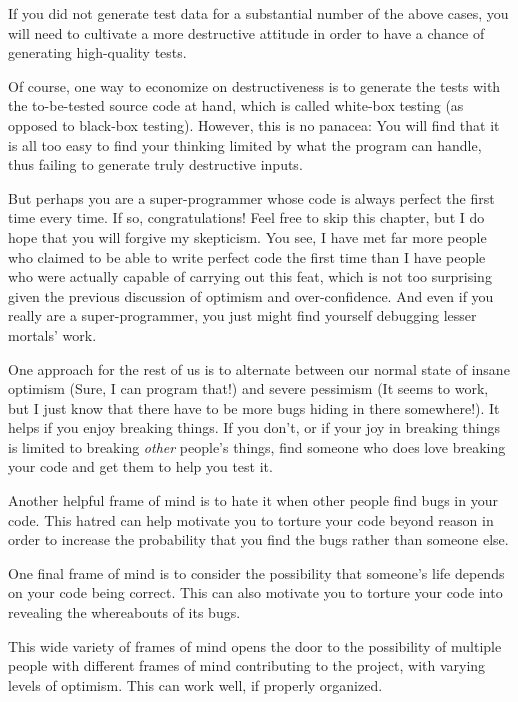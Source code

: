 {	If you did not generate test data for a substantial number of
	the above cases, you will need to cultivate a more destructive
	attitude in order to have a chance of generating high-quality
	tests.

	Of course, one way to economize on destructiveness is to
	generate the tests with the to-be-tested source code at hand,
	which is called white-box testing (as opposed to black-box testing).
	However, this is no panacea: You will find that it is all too
	easy to find your thinking limited by what the program can handle,
	thus failing to generate truly destructive inputs.
} \QuickQuizEnd

But perhaps you are a super-programmer whose code is always perfect
the first time every time.
If so, congratulations!
Feel free to skip this chapter, but
I do hope that you will forgive my skepticism.
You see, I have met far more people who claimed to be able
to write perfect code the first time than I have
people who were actually capable of carrying out this feat, which
is not too surprising given the previous discussion of optimism
and over-confidence.
And even if you really are a super-programmer, you just might
find yourself debugging lesser mortals' work.

One approach for the rest of us is to alternate between our normal
state of insane optimism
(Sure, I can program that!) and severe pessimism
(It seems to work, but I just know that there have to be more bugs hiding
in there somewhere!).
It helps if you enjoy breaking things.
If you don't, or if your joy in breaking things is limited to breaking
\emph{other} people's things, find someone who does love breaking your
code and get them to help you test it.

Another helpful frame of mind is to hate it when other people find bugs in
your code.
This hatred can help motivate you to torture your code beyond reason
in order to increase the probability that you find the bugs rather than
someone else.

One final frame of mind is to consider the possibility that someone's
life depends on your code being correct.
This can also motivate you to torture your code into revealing the
whereabouts of its bugs.

This wide variety of frames of mind opens the door to
the possibility of multiple people with different frames of
mind contributing to the project, with varying levels of optimism.
This can work well, if properly organized.

